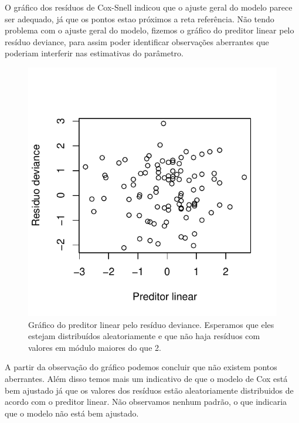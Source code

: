 \documentclass{article}\usepackage[]{graphicx}\usepackage[]{color}
\makeatletter
\def\maxwidth{ %
  \ifdim\Gin@nat@width>\linewidth
    \linewidth
  \else
    \Gin@nat@width
  \fi
}
\newenvironment{knitrout}{}{} %
\makeatother
\begin{document}
O gráfico dos resíduos de Cox-Snell indicou que o ajuste geral do modelo parece ser adequado, já que os pontos estao próximos a reta referência. Não tendo problema com o ajuste geral do modelo, fizemos o gráfico do preditor linear pelo resíduo deviance, para assim poder identificar observações aberrantes que poderiam interferir nas estimativas do parâmetro.

\begin{figure}[t!]
\centering
\begin{knitrout}
\color{fgcolor}
\includegraphics[width=\maxwidth]{figure/unnamed-chunk-9} 

\end{knitrout}
\caption{Gráfico do preditor linear pelo resíduo deviance. Esperamos que eles estejam distribuídos aleatoriamente e que não haja resíduos com valores em módulo maiores do que 2.}
\end{figure}

A partir da observação do gráfico podemos concluir que não existem pontos aberrantes. Além disso temos mais um indicativo de que o modelo de Cox está bem ajustado já que os valores dos resíduos estão aleatoriamente distribuidos de acordo com o preditor linear. Não observamos nenhum padrão, o que indicaria que o modelo não está bem ajustado.
\end{document}
